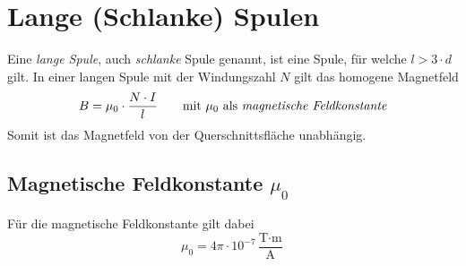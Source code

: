 \documentclass{article}
\begin{document}
\section{Lange (Schlanke) Spulen} 
Eine \emph{lange Spule}, auch \emph{schlanke} Spule genannt, ist eine Spule, für welche $l > 3 \cdot d$ gilt. In einer langen Spule mit der Windungszahl $N$ gilt das homogene Magnetfeld
\[
 B = \mu_0 \cdot \frac{N \cdot I}{l}
 \qquad \text{mit $\mu_0$ als \emph{magnetische Feldkonstante}}
\] 
Somit ist das Magnetfeld von der Querschnittsfläche unabhängig. 
 
\subsection{Magnetische Feldkonstante $\mu_0$} 
Für die magnetische Feldkonstante gilt dabei
\[
 \mu_0 = 4 \pi \cdot 10^{-7} \frac{\text{T} \cdot \text{m}}{\text{A}} 
\] 
\end{document}
